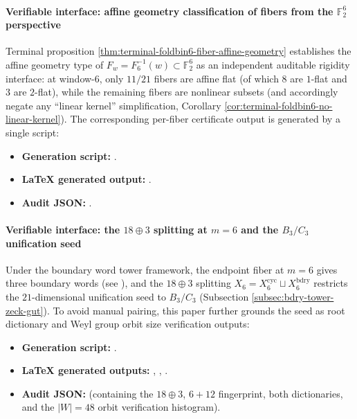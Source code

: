 \paragraph{Verifiable interface: affine geometry classification of fibers from the \texorpdfstring{$\mathbb{F}_2^6$}{F2^6} perspective}
Terminal proposition \ref{thm:terminal-foldbin6-fiber-affine-geometry} establishes the affine geometry type of \(F_w=F_6^{-1}(w)\subset\mathbb{F}_2^6\) as an independent auditable rigidity interface: at window-\(6\), only \(11/21\) fibers are affine flat (of which \(8\) are \(1\)-flat and \(3\) are \(2\)-flat), while the remaining fibers are nonlinear subsets (and accordingly negate any ``linear kernel'' simplification, Corollary \ref{cor:terminal-foldbin6-no-linear-kernel}).
The corresponding per-fiber certificate output is generated by a single script:
\begin{itemize}
  \item \textbf{Generation script:} \texttt{}.
  \item \textbf{LaTeX generated output:} \texttt{}.
  \item \textbf{Audit JSON:} \texttt{}.
\end{itemize}

\paragraph{Verifiable interface: the \(18\oplus 3\) splitting at \(m=6\) and the \(B_3/C_3\) unification seed}
Under the boundary word tower framework, the endpoint fiber at \(m=6\) gives three boundary words (see \texttt{}), and the \(18\oplus 3\) splitting \(X_6=X_6^{\mathrm{cyc}}\sqcup X_6^{\mathrm{bdry}}\) restricts the \(21\)-dimensional unification seed to \(B_3/C_3\) (Subsection \ref{subsec:bdry-tower-zeck-gut}).
To avoid manual pairing, this paper further grounds the seed as root dictionary and Weyl group orbit size verification outputs:
\begin{itemize}
  \item \textbf{Generation script:} \texttt{}.
  \item \textbf{LaTeX generated outputs:} \texttt{},
  \texttt{},
  \texttt{}.
  \item \textbf{Audit JSON:} \texttt{} (containing the \(18\oplus 3\), \(6+12\) fingerprint, both dictionaries, and the \(|W|=48\) orbit verification histogram).
\end{itemize}

